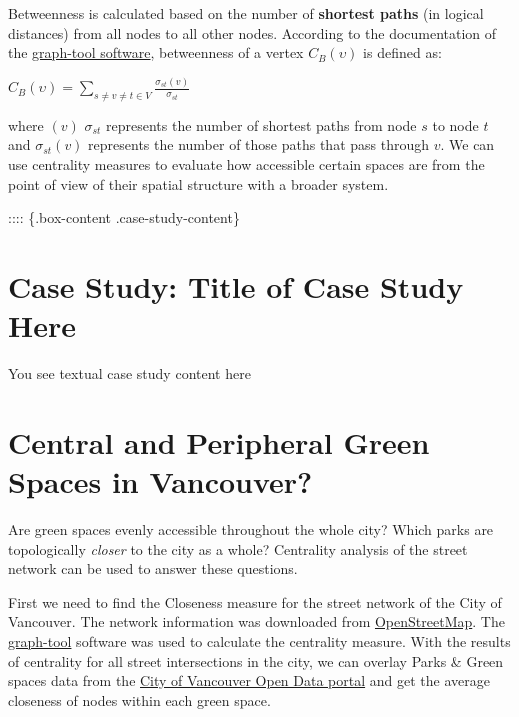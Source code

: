 \documentclass[
]{book}
\begin{document}
Betweenness is calculated based on the number of \textbf{shortest paths} (in logical distances) from all nodes to all other nodes. According to the documentation of the \href{https://graph-tool.skewed.de/static/doc/centrality.html}{graph-tool software}, betweenness of a vertex \(C_{B}(\upsilon)\) is defined as:

\(C_{B}(\upsilon) = \sum\limits_{s \neq v \neq t \in V} \frac {\sigma_{st}(v)}{\sigma_{st}}\)

where \((v)\) \({\sigma_{st}}\) represents the number of shortest paths from node \(s\) to node \(t\) and \({\sigma_{st}(v)}\) represents the number of those paths that pass through \(v\). We can use centrality measures to evaluate how accessible certain spaces are from the point of view of their spatial structure with a broader system.

:::: \{.box-content .case-study-content\}

\hypertarget{case-study-title-of-case-study-here-1}{%
\section{Case Study: Title of Case Study Here}\label{case-study-title-of-case-study-here-1}}

You see textual case study content here

\hypertarget{box-text}{%
\section*{Central and Peripheral Green Spaces in Vancouver?}\label{box-text}}

Are green spaces evenly accessible throughout the whole city? Which parks are topologically \emph{closer} to the city as a whole? Centrality analysis of the street network can be used to answer these questions.

First we need to find the Closeness measure for the street network of the City of Vancouver. The network information was downloaded from \href{https://www.openstreetmap.org/}{OpenStreetMap}. The \href{https://graph-tool.skewed.de/}{graph-tool} software was used to calculate the centrality measure. With the results of centrality for all street intersections in the city, we can overlay Parks \& Green spaces data from the \href{https://opendata.vancouver.ca/explore/dataset/parks-polygon-representation/information/}{City of Vancouver Open Data portal} and get the average closeness of nodes within each green space.
\end{document}
